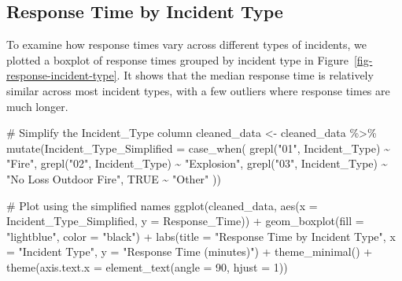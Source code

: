 \documentclass[
  letterpaper,
  DIV=11,
  numbers=noendperiod]{scrartcl}
\newenvironment{Shaded}{\begin{snugshade}}{\end{snugshade}}
\newcommand{\AttributeTok}[1]{\textcolor[rgb]{0.40,0.45,0.13}{#1}}
\newcommand{\CommentTok}[1]{\textcolor[rgb]{0.37,0.37,0.37}{#1}}
\newcommand{\ConstantTok}[1]{\textcolor[rgb]{0.56,0.35,0.01}{#1}}
\newcommand{\DecValTok}[1]{\textcolor[rgb]{0.68,0.00,0.00}{#1}}
\newcommand{\FunctionTok}[1]{\textcolor[rgb]{0.28,0.35,0.67}{#1}}
\newcommand{\NormalTok}[1]{\textcolor[rgb]{0.00,0.23,0.31}{#1}}
\newcommand{\OtherTok}[1]{\textcolor[rgb]{0.00,0.23,0.31}{#1}}
\newcommand{\SpecialCharTok}[1]{\textcolor[rgb]{0.37,0.37,0.37}{#1}}
\newcommand{\StringTok}[1]{\textcolor[rgb]{0.13,0.47,0.30}{#1}}
\begin{document}
\hypertarget{response-time-by-incident-type}{%
\subsection{Response Time by Incident
Type}\label{response-time-by-incident-type}}

To examine how response times vary across different types of incidents,
we plotted a boxplot of response times grouped by incident type in
Figure~\ref{fig-response-incident-type}. It shows that the median
response time is relatively similar across most incident types, with a
few outliers where response times are much longer.

\begin{Shaded}
\begin{Highlighting}[]
\CommentTok{\# Simplify the Incident\_Type column}
\NormalTok{cleaned\_data }\OtherTok{\textless{}{-}}\NormalTok{ cleaned\_data }\SpecialCharTok{\%\textgreater{}\%}
  \FunctionTok{mutate}\NormalTok{(}\AttributeTok{Incident\_Type\_Simplified =} \FunctionTok{case\_when}\NormalTok{(}
    \FunctionTok{grepl}\NormalTok{(}\StringTok{"01"}\NormalTok{, Incident\_Type) }\SpecialCharTok{\textasciitilde{}} \StringTok{"Fire"}\NormalTok{,}
    \FunctionTok{grepl}\NormalTok{(}\StringTok{"02"}\NormalTok{, Incident\_Type) }\SpecialCharTok{\textasciitilde{}} \StringTok{"Explosion"}\NormalTok{,}
    \FunctionTok{grepl}\NormalTok{(}\StringTok{"03"}\NormalTok{, Incident\_Type) }\SpecialCharTok{\textasciitilde{}} \StringTok{"No Loss Outdoor Fire"}\NormalTok{,}
    \ConstantTok{TRUE} \SpecialCharTok{\textasciitilde{}} \StringTok{"Other"}
\NormalTok{  ))}

\CommentTok{\# Plot using the simplified names}
\FunctionTok{ggplot}\NormalTok{(cleaned\_data, }\FunctionTok{aes}\NormalTok{(}\AttributeTok{x =}\NormalTok{ Incident\_Type\_Simplified, }\AttributeTok{y =}\NormalTok{ Response\_Time)) }\SpecialCharTok{+}
  \FunctionTok{geom\_boxplot}\NormalTok{(}\AttributeTok{fill =} \StringTok{"lightblue"}\NormalTok{, }\AttributeTok{color =} \StringTok{"black"}\NormalTok{) }\SpecialCharTok{+}
  \FunctionTok{labs}\NormalTok{(}\AttributeTok{title =} \StringTok{"Response Time by Incident Type"}\NormalTok{, }\AttributeTok{x =} \StringTok{"Incident Type"}\NormalTok{, }\AttributeTok{y =} \StringTok{"Response Time (minutes)"}\NormalTok{) }\SpecialCharTok{+}
  \FunctionTok{theme\_minimal}\NormalTok{() }\SpecialCharTok{+}
  \FunctionTok{theme}\NormalTok{(}\AttributeTok{axis.text.x =} \FunctionTok{element\_text}\NormalTok{(}\AttributeTok{angle =} \DecValTok{90}\NormalTok{, }\AttributeTok{hjust =} \DecValTok{1}\NormalTok{))}
\end{Highlighting}
\end{Shaded}
\end{document}
